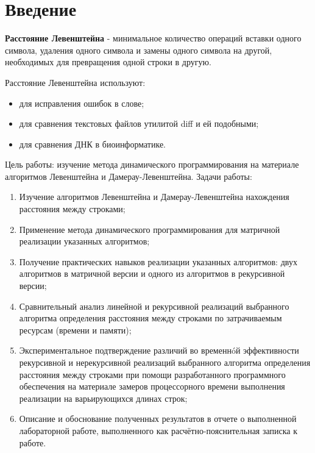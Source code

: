 \documentclass[a4paper, 14pt]{article}
\begin{document}
        \section*{Введение}
        \begin{flushleft}
        \parindent=1cm
        \textbf{Расстояние Левенштейна} - минимальное количество операций вставки одного символа, удаления одного символа и замены одного символа на другой, необходимых для превращения одной строки в другую.
        
        Расстояние Левенштейна используют:
        \begin{itemize}
        	\item для исправления ошибок в слове;
			\item для сравнения текстовых файлов утилитой diff и ей подобными;
			\item для сравнения ДНК в биоинформатике.
		\end{itemize}

        Цель работы: изучение метода динамического программирования на материале алгоритмов	Левенштейна и Дамерау-Левенштейна.
		Задачи работы:\\
		\begin{enumerate}
			\item Изучение алгоритмов Левенштейна и Дамерау-Левенштейна нахождения расстояния между
		строками;

			\item Применение метода динамического программирования для матричной реализации указанных
		алгоритмов;

			\item Получение практических навыков реализации указанных алгоритмов: двух алгоритмов в
		матричной версии и одного из алгоритмов в рекурсивной версии;

			\item Сравнительный анализ линейной и рекурсивной реализаций выбранного алгоритма
		определения расстояния между строками по затрачиваемым ресурсам (времени и памяти);

			\item Экспериментальное подтверждение различий во временнóй эффективности рекурсивной и
		нерекурсивной реализаций выбранного алгоритма определения расстояния между строками при
		помощи разработанного программного обеспечения на материале замеров процессорного времени
		выполнения реализации на варьирующихся длинах строк;

			\item Описание и обоснование полученных результатов в отчете о выполненной лабораторной
		работе, выполненного как расчётно-пояснительная записка к работе.
		\end{enumerate}
        \end{flushleft}
\end{document}
